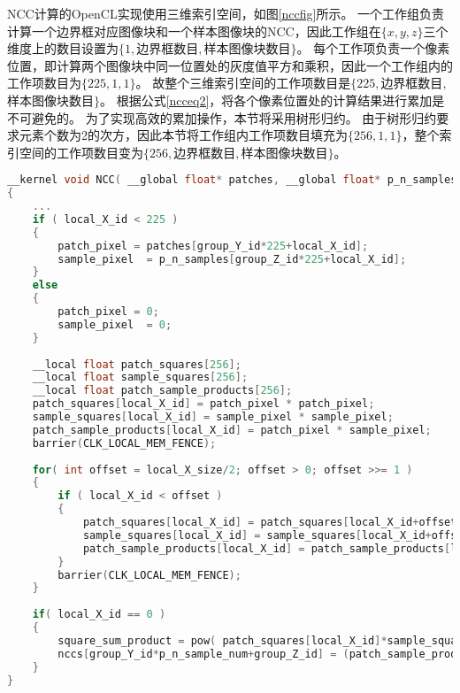 NCC计算的OpenCL实现使用三维索引空间，如图\ref{nccfig}所示。
一个工作组负责计算一个边界框对应图像块和一个样本图像块的NCC，因此工作组在$\{x, y, z\}$三个维度上的数目设置为$\{1, $边界框数目$, $样本图像块数目$\}$。
每个工作项负责一个像素位置，即计算两个图像块中同一位置处的灰度值平方和乘积，因此一个工作组内的工作项数目为$\{225, 1, 1\}$。
故整个三维索引空间的工作项数目是$\{225, $边界框数目$, $样本图像块数目$\}$。
根据公式\ref{ncceq2}，将各个像素位置处的计算结果进行累加是不可避免的。
为了实现高效的累加操作，本节将采用树形归约。
由于树形归约要求元素个数为2的次方，因此本节将工作组内工作项数目填充为$\{256, 1, 1\}$，整个索引空间的工作项数目变为$\{256, $边界框数目$, $样本图像块数目$\}$。

\begin{table}
\caption{NCC计算的Kernel程序}
\label{ncccode}
\begin{lstlisting}[language=C++, basicstyle=\ttfamily\footnotesize]    
__kernel void NCC( __global float* patches, __global float* p_n_samples, int p_n_sample_num, __global float* nccs )
{		
    ...
    if ( local_X_id < 225 ) 
    {
        patch_pixel = patches[group_Y_id*225+local_X_id];
        sample_pixel  = p_n_samples[group_Z_id*225+local_X_id];
    }
    else
    {
        patch_pixel = 0;
        sample_pixel  = 0;
    }
    
    __local float patch_squares[256];
    __local float sample_squares[256];
    __local float patch_sample_products[256];
    patch_squares[local_X_id] = patch_pixel * patch_pixel;
    sample_squares[local_X_id] = sample_pixel * sample_pixel;
    patch_sample_products[local_X_id] = patch_pixel * sample_pixel;	
    barrier(CLK_LOCAL_MEM_FENCE);
    
    for( int offset = local_X_size/2; offset > 0; offset >>= 1 ) 
    {
        if ( local_X_id < offset ) 
        {
            patch_squares[local_X_id] = patch_squares[local_X_id+offset] + patch_squares[local_X_id];
            sample_squares[local_X_id] = sample_squares[local_X_id+offset] + sample_squares[local_X_id];
            patch_sample_products[local_X_id] = patch_sample_products[local_X_id+offset] + patch_sample_products[local_X_id];
        }
        barrier(CLK_LOCAL_MEM_FENCE);
    }
	
    if( local_X_id == 0 )
    {	
        square_sum_product = pow( patch_squares[local_X_id]*sample_squares[local_X_id], 0.5 );
        nccs[group_Y_id*p_n_sample_num+group_Z_id] = (patch_sample_products[local_X_id]/square_sum_product + 1) * 0.5;
    }
}
\end{lstlisting}
\end{table}

